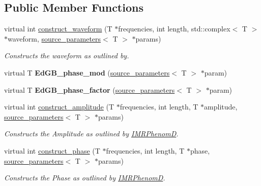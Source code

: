 \subsection*{Public Member Functions}
\begin{DoxyCompactItemize}
\item 
virtual int \hyperlink{classEdGB__IMRPhenomD_a11f86d5239ced2ab1372375cd930f12c}{construct\+\_\+waveform} (T $\ast$frequencies, int length, std\+::complex$<$ T $>$ $\ast$waveform, \hyperlink{structsource__parameters}{source\+\_\+parameters}$<$ T $>$ $\ast$params)
\begin{DoxyCompactList}\small\item\em Constructs the waveform as outlined by. \end{DoxyCompactList}\item 
\mbox{\label{classEdGB__IMRPhenomD_a033e2181401b6c440bfabd3a2b16d42a}} 
virtual T {\bfseries Ed\+G\+B\+\_\+phase\+\_\+mod} (\hyperlink{structsource__parameters}{source\+\_\+parameters}$<$ T $>$ $\ast$param)
\item 
\mbox{\label{classEdGB__IMRPhenomD_a3f0d31deb796dc11c00c36caa21cfc25}} 
virtual T {\bfseries Ed\+G\+B\+\_\+phase\+\_\+factor} (\hyperlink{structsource__parameters}{source\+\_\+parameters}$<$ T $>$ $\ast$param)
\item 
virtual int \hyperlink{classEdGB__IMRPhenomD_ae845acb1900b80ce6b23952939f64f2a}{construct\+\_\+amplitude} (T $\ast$frequencies, int length, T $\ast$amplitude, \hyperlink{structsource__parameters}{source\+\_\+parameters}$<$ T $>$ $\ast$params)
\begin{DoxyCompactList}\small\item\em Constructs the Amplitude as outlined by \hyperlink{classIMRPhenomD}{I\+M\+R\+PhenomD}. \end{DoxyCompactList}\item 
virtual int \hyperlink{classEdGB__IMRPhenomD_ad4a5d858678d07912f43e8a045f5979b}{construct\+\_\+phase} (T $\ast$frequencies, int length, T $\ast$phase, \hyperlink{structsource__parameters}{source\+\_\+parameters}$<$ T $>$ $\ast$params)
\begin{DoxyCompactList}\small\item\em Constructs the Phase as outlined by \hyperlink{classIMRPhenomD}{I\+M\+R\+PhenomD}. \end{DoxyCompactList}\end{DoxyCompactItemize}


